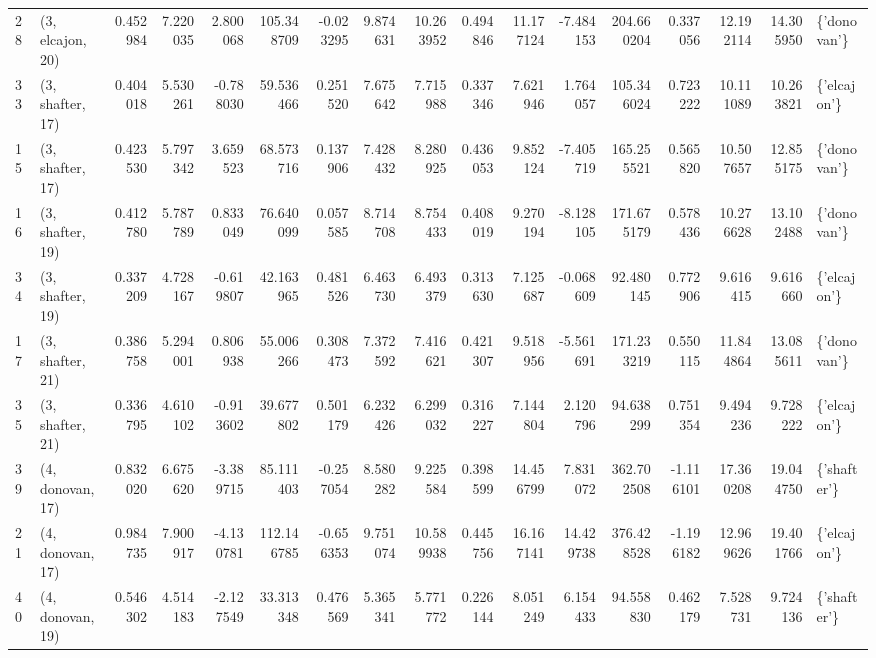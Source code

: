 \begin{tabular}{llrrrrrrrrrrrrrrl}
28 &  (3, elcajon, 20) &   0.452984 &   7.220035 &  2.800068 &  105.348709 & -0.023295 &   9.874631 &  10.263952 &  0.494846 &  11.177124 &  -7.484153 &  204.660204 &  0.337056 &  12.192114 &  14.305950 &  \{'donovan'\} \\
33 &  (3, shafter, 17) &   0.404018 &   5.530261 & -0.788030 &   59.536466 &  0.251520 &   7.675642 &   7.715988 &  0.337346 &   7.621946 &   1.764057 &  105.346024 &  0.723222 &  10.111089 &  10.263821 &  \{'elcajon'\} \\
15 &  (3, shafter, 17) &   0.423530 &   5.797342 &  3.659523 &   68.573716 &  0.137906 &   7.428432 &   8.280925 &  0.436053 &   9.852124 &  -7.405719 &  165.255521 &  0.565820 &  10.507657 &  12.855175 &  \{'donovan'\} \\
16 &  (3, shafter, 19) &   0.412780 &   5.787789 &  0.833049 &   76.640099 &  0.057585 &   8.714708 &   8.754433 &  0.408019 &   9.270194 &  -8.128105 &  171.675179 &  0.578436 &  10.276628 &  13.102488 &  \{'donovan'\} \\
34 &  (3, shafter, 19) &   0.337209 &   4.728167 & -0.619807 &   42.163965 &  0.481526 &   6.463730 &   6.493379 &  0.313630 &   7.125687 &  -0.068609 &   92.480145 &  0.772906 &   9.616415 &   9.616660 &  \{'elcajon'\} \\
17 &  (3, shafter, 21) &   0.386758 &   5.294001 &  0.806938 &   55.006266 &  0.308473 &   7.372592 &   7.416621 &  0.421307 &   9.518956 &  -5.561691 &  171.233219 &  0.550115 &  11.844864 &  13.085611 &  \{'donovan'\} \\
35 &  (3, shafter, 21) &   0.336795 &   4.610102 & -0.913602 &   39.677802 &  0.501179 &   6.232426 &   6.299032 &  0.316227 &   7.144804 &   2.120796 &   94.638299 &  0.751354 &   9.494236 &   9.728222 &  \{'elcajon'\} \\
39 &  (4, donovan, 17) &   0.832020 &   6.675620 & -3.389715 &   85.111403 & -0.257054 &   8.580282 &   9.225584 &  0.398599 &  14.456799 &   7.831072 &  362.702508 & -1.116101 &  17.360208 &  19.044750 &  \{'shafter'\} \\
21 &  (4, donovan, 17) &   0.984735 &   7.900917 & -4.130781 &  112.146785 & -0.656353 &   9.751074 &  10.589938 &  0.445756 &  16.167141 &  14.429738 &  376.428528 & -1.196182 &  12.969626 &  19.401766 &  \{'elcajon'\} \\
40 &  (4, donovan, 19) &   0.546302 &   4.514183 & -2.127549 &   33.313348 &  0.476569 &   5.365341 &   5.771772 &  0.226144 &   8.051249 &   6.154433 &   94.558830 &  0.462179 &   7.528731 &   9.724136 &  \{'shafter'\} \\

\end{tabular}
